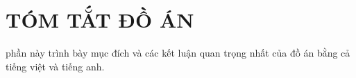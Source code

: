 \section*{TÓM TẮT ĐỒ ÁN}
phần này trình bày mục đích và các kết luận quan trọng nhất của đồ án bằng cả tiếng việt và tiếng anh.
